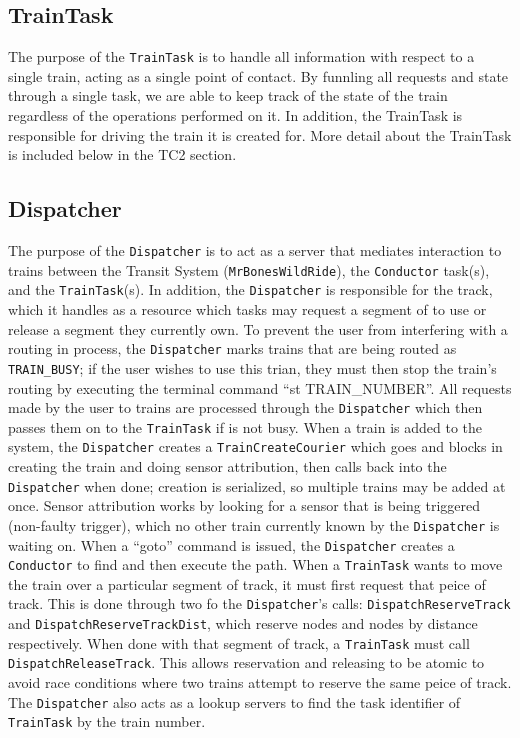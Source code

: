 \documentclass[12pt]{article}
\begin{document}
\subsection{TrainTask}
The purpose of the \texttt{TrainTask} is to handle all information with respect
to a single train, acting as a single point of contact. By funnling all requests
and state through a single task, we are able to keep track of the state of the
train regardless of the operations performed on it. In addition, the TrainTask
is responsible for driving the train it is created for. More detail about
the TrainTask is included below in the TC2 section.
\\[1\baselineskip]
\subsection{Dispatcher}
The purpose of the \texttt{Dispatcher} is to act as a server that mediates interaction to trains between the Transit System (\texttt{MrBonesWildRide}), the \texttt{Conductor} task(s), and the \texttt{TrainTask}(s).  In addition, the \texttt{Dispatcher} is responsible for the track, which it handles as a resource which tasks may request a segment of to use or release a segment they currently own.  To prevent the user from interfering with a routing in process, the \texttt{Dispatcher} marks trains that are being routed as \texttt{TRAIN\_BUSY}; if the user wishes to use this trian, they must then stop the train's routing by executing the terminal command ``st TRAIN\_NUMBER''.  All requests made by the user to trains are processed through the \texttt{Dispatcher} which then passes them on to the \texttt{TrainTask} if is not busy.  When a train is added to the system, the \texttt{Dispatcher} creates a \texttt{TrainCreateCourier} which goes and blocks in creating the train and doing sensor attribution, then calls back into the \texttt{Dispatcher} when done; creation is serialized, so multiple trains may be added at once.  Sensor attribution works by looking for a sensor that is being triggered (non-faulty trigger), which no other train currently known by the \texttt{Dispatcher} is waiting on.  When a ``goto'' command is issued, the \texttt{Dispatcher} creates a \texttt{Conductor} to find and then execute the path.  When a \texttt{TrainTask} wants to move the train over a particular segment of track, it must first request that peice of track.  This is done through two fo the \texttt{Dispatcher}'s calls: \texttt{DispatchReserveTrack} and \texttt{DispatchReserveTrackDist}, which reserve nodes and nodes by distance respectively.  When done with that segment of track, a \texttt{TrainTask} must call \texttt{DispatchReleaseTrack}.  This allows reservation and releasing to be atomic to avoid race conditions where two trains attempt to reserve the same peice of track.  The \texttt{Dispatcher} also acts as a lookup servers to find the task identifier of \texttt{TrainTask} by the train number.
\\[1\baselineskip]
\end{document}
